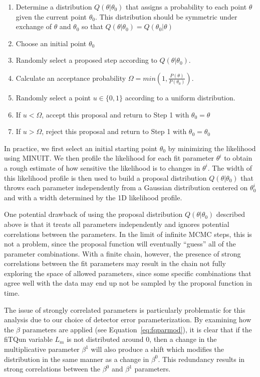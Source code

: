 {\begin{enumerate}
  \item Determine a distribution $Q(\theta|\theta_{0})$ that assigns a
    probability to each point $\theta$ given the current point $\theta_{0}$.
    This distribution should be symmetric under exchange of $\theta$ and
    $\theta_{0}$ so that $Q(\theta|\theta_{0}) = Q(\theta_{0}|\theta) $
  \item Choose an initial point  $\theta_{0}$
  \item Randomly select a proposed step according to $Q(\theta|\theta_{0})$.
  \item Calculate an acceptance probability $\Omega = min(1,\frac{P(\theta)}{P(\theta_{0})})$.
  \item Randomly select a point $u \in \{0, 1\}$ according to a uniform distribution.
  \item If $u<\Omega$, accept this proposal and return to Step 1 with $\theta_{0} = \theta$ 
  \item If $u>\Omega$, reject this proposal and return to Step 1 with $\theta_{0} = \theta_{0}$ 
\end{enumerate}

In practice, we first select an initial starting point $\theta_{0}$ by
minimizing the likelihood using MINUIT\@.  We then profile the likelihood for
each fit parameter $\theta^{i}$ to obtain a rough estimate of how sensitive the
likelihood is to changes in $\theta^{i}$.  The width of this likelihood profile
is then used to build a proposal distribution $Q(\theta|\theta_{0})$ that
throws each parameter independently from a Gaussian distribution centered on
$\theta^{i}_{0}$ and with a width determined by the 1D likelihood profile.

One potential drawback of using the proposal distribution
$Q(\theta|\theta_{0})$ described above is that it treats all parameters
independently and ignores potential correlations between the parameters.  In
the limit of infinite MCMC steps, this is not a problem, since the proposal
function will eventually ``guess'' all of the parameter combinations.  With a
finite chain, however, the presence of strong correlations between the fit
parameters may result in the chain not fully exploring the space of allowed
parameters, since some specific combinations that agree well with the data may
end up not be sampled by the proposal function in time.

The issue of strongly correlated parameters is particularly problematic for
this analysis due to our choice of detector error parameterization.  By
examining how the $\beta$ parameters are applied (see
Equation~\ref{eq:fqparmod}), it is clear that if the fiTQun variable $L_{m}$ is
not distributed around $0$, then a change in the multiplicative parameter
$\beta^{1}$ will also produce a shift which modifies the distribution in the
same manner as a change in $\beta^{0}$.  This redundancy results in strong
correlations between the $\beta^{0}$ and $\beta^{1}$ parameters.

}
